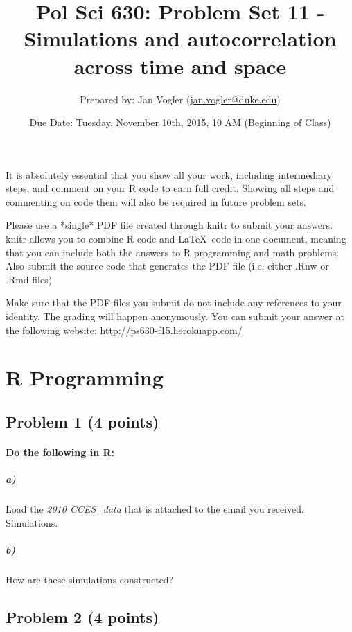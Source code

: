 \documentclass[12pt]{article}
\begin{document}
\title{Pol Sci 630: Problem Set 11 - Simulations and autocorrelation across time and space}

\author{Prepared by: Jan Vogler (\href{mailto:jan.vogler@duke.edu}{jan.vogler@duke.edu})}

\date{Due Date: Tuesday, November 10th, 2015, 10 AM (Beginning of Class)}
 
\maketitle 



It is absolutely essential that you show all your work, including intermediary steps, and comment on your R code to earn full credit. Showing all steps and commenting on code them will also be required in future problem sets.

Please use a *single* PDF file created through knitr to submit your answers. knitr allows you to combine R code and \LaTeX \ code in one document, meaning that you can include both the answers to R programming and math problems. Also submit the source code that generates the PDF file (i.e. either .Rnw or .Rmd files)

Make sure that the PDF files you submit do not include any references to your identity. The grading will happen anonymously. You can submit your answer at the following website: \url{http://ps630-f15.herokuapp.com/}



\section*{R Programming}

\subsection*{Problem 1 (4 points)}

\paragraph{Do the following in R:}

\subparagraph{a)} Load the \textit{2010 CCES\_data} that is attached to the email you received. Simulations.

\subparagraph{b)} How are these simulations constructed?



\subsection*{Problem 2 (4 points)}
\end{document}
